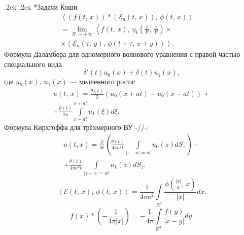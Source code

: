 \documentclass[10pt,landscape,a4paper]{article}
\makeatletter
\renewcommand{\section}{\@startsection{section}{1}{0mm}%
                                {.2ex}%
                                {.2ex}%
                                {%
			\sffamily\small\bfseries}}
\makeatother
\begin{document}
\begin{multicols*}{5}
\section*{Задачи Коши}
\begin{multline*}
	\left<\left( f\left( t,\,x \right) 
	\right) *\left( \mathcal{E}_a \left( t,\,x \right)  \right),\,\phi(t,\,x) \right> =\\=
	\lim_{R \to +\infty} 
	\left< f\left( t,\,x \right) ,\,
	\eta_{1} \left( \frac{t}{R},\,
	\frac{x}{R}\right) \right. \times \\ \times \left.
	\left<\mathcal{E}_a\left( \tau,\,y \right) 
	,\,\phi\left( t+\tau,\,x+y \right) \right> \right> 
.\end{multline*}
Формула Даламбера для
одномерного
волнового уравнения с
правой частью специального вида
\[
	\delta'(t)u_0(x)+\delta(t)u_1(x)
,\]
где $u_0(x),\ u_1(x)$ --- медленного роста:
\begin{multline*}
	u(t,\,x)= \frac{\theta(t)}{2}\left( u_0
	(x+at)+u_0(x-at)\right) 
	+\\+\frac{\theta(t)}{2a}
	\int\limits_{x-at}^{x+at}  
	u_1\left( \xi \right) d\xi
.\end{multline*} 
Формула Кирхгоффа для
трёхмерного ВУ -//-:
\begin{multline*}
	u(t,x)= \frac{\partial }{\partial t} 
	\left( \frac{\theta(t)}{4\pi a^2 t}
	\int\limits_{|z-x|=at}^{} u_0(z)d S_z \right) +\\+
	\frac{\theta(t)}{4\pi a^2 t}
	\int\limits_{|z-x|=at}^{} 
	u_1(z)d S_z
.\end{multline*} 
\[
	\left<\mathcal{E}(t,\,x),\,\phi(t,\,x) \right> =\frac{1}{4\pi a^2} \int\limits_{\mathbb{R}^3}^{} \frac{\phi\left( \frac{|x|}{a},\,x \right) }{|x|}dx 
.\] 
\[
	f(x)* \left( -\frac{1}{4\pi |x|} \right) 
	=-\frac{1}{4\pi} \int\limits_{\mathbb{R}^3}^{} \frac{f(y)}{|x-y|} dy
.\] 
\vfill\null
\end{multicols*}
 
\end{document}
